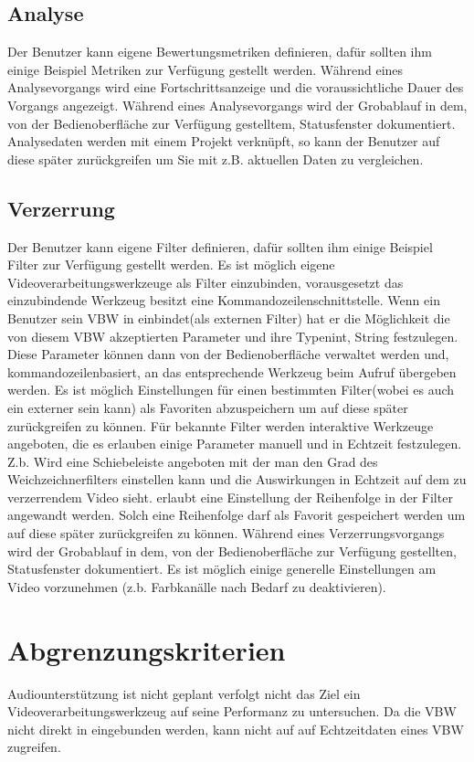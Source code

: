 \subsection{Analyse}
 Der Benutzer kann eigene Bewertungsmetriken definieren, dafür sollten ihm einige Beispiel
			Metriken zur Verfügung gestellt werden.
 Während eines Analysevorgangs wird eine Fortschrittsanzeige und die voraussichtliche Dauer
			des Vorgangs angezeigt.
	Während eines Analysevorgangs wird der Grobablauf in dem, von der Bedienoberfläche zur
			 Verfügung gestelltem, Statusfenster dokumentiert.
 	Analysedaten werden mit einem Projekt verknüpft, so kann der Benutzer auf diese später
			zurückgreifen um Sie mit z.B. aktuellen Daten zu vergleichen.
\subsection{Verzerrung}
 Der Benutzer kann eigene Filter definieren, dafür sollten ihm einige Beispiel Filter zur
			Verfügung gestellt werden.
 Es ist möglich eigene Videoverarbeitungswerkzeuge als Filter einzubinden, vorausgesetzt
			das einzubindende Werkzeug besitzt eine Kommandozeilenschnittstelle.
 Wenn ein Benutzer sein \gls{VBW} in \projektTitel einbindet(als externen Filter) hat er die
			Möglichkeit die von diesem \gls{VBW} akzeptierten Parameter und ihre Typen{int, String}
			festzulegen. Diese Parameter können dann von der Bedienoberfläche verwaltet werden und, 
			kommandozeilenbasiert, an das entsprechende Werkzeug beim Aufruf übergeben werden.
 Es ist möglich Einstellungen für einen bestimmten Filter(wobei es auch ein externer sein kann)
			 als Favoriten abzuspeichern um auf diese später zurückgreifen zu können.
 Für bekannte Filter werden interaktive Werkzeuge angeboten, die es erlauben einige Parameter
			manuell und in Echtzeit festzulegen. Z.b. Wird eine Schiebeleiste angeboten mit der
			man den Grad des Weichzeichnerfilters einstellen kann und die Auswirkungen in Echtzeit auf
			dem zu verzerrendem Video sieht.
 \projektTitel erlaubt eine Einstellung der Reihenfolge in der Filter angewandt werden. Solch
			eine Reihenfolge darf als Favorit gespeichert werden um auf diese später zurückgreifen zu können.
	Während eines Verzerrungsvorgangs wird der Grobablauf in dem, von der Bedienoberfläche zur
			 Verfügung gestellten, Statusfenster dokumentiert.
	Es ist möglich einige generelle Einstellungen am Video vorzunehmen (z.b. Farbkanälle 
			nach Bedarf zu deaktivieren).

\section{Abgrenzungskriterien}
\setcounter{counterKriterien}{0}
 Audiounterstützung ist nicht geplant
 \projektTitel verfolgt nicht das Ziel ein Videoverarbeitungswerkzeug auf seine Performanz zu untersuchen.
 Da die \gls{VBW} nicht direkt in \projektTitel eingebunden
			werden, kann \projektTitel nicht auf auf Echtzeitdaten eines \gls{VBW} zugreifen.

